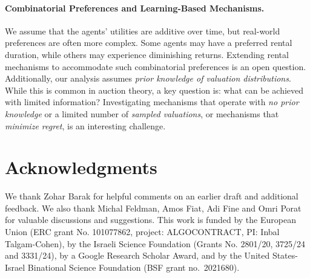 \documentclass[11pt,letterpaper]{article}
\theoremstyle{plain}
\begin{document}
\paragraph{Combinatorial Preferences and Learning-Based Mechanisms.}  
We assume that the agents' utilities are additive over time, but real-world preferences are often more complex. Some agents may have a preferred rental duration, while others may experience diminishing returns. Extending rental mechanisms to accommodate such combinatorial preferences is an open question.
Additionally, our analysis assumes \emph{prior knowledge of valuation distributions}. While this is common in auction theory, a key question is: what can be achieved with limited information? Investigating mechanisms that operate with \emph{no prior knowledge} or a limited number of \emph{sampled valuations},
or mechanisms that \emph{minimize regret},
is an interesting challenge.

\section*{Acknowledgments}
We thank Zohar Barak for helpful comments on an earlier draft and additional feedback. We also thank Michal Feldman, Amos Fiat, Adi Fine and Omri Porat for valuable discussions and suggestions.
This work
is funded by the European Union (ERC grant No. 101077862, project: ALGOCONTRACT, PI:
Inbal Talgam-Cohen), by the Israeli Science Foundation (Grants No. 2801/20, 3725/24 and 3331/24), by a Google Research Scholar Award, and by the United States-Israel Binational Science Foundation (BSF grant no.~2021680).





\end{document}
